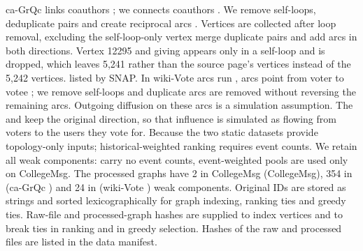 \documentclass[smallextended]{svjour3}
\providecommand{\DIFaddtex}[1]{{\protect\color{blue} \sf #1}} %
\providecommand{\DIFdeltex}[1]{{\protect\color{red} \scriptsize #1}} %
\providecommand{\DIFaddbegin}{} %
\providecommand{\DIFaddend}{} %
\providecommand{\DIFdelbegin}{} %
\providecommand{\DIFdelend}{} %
\providecommand{\DIFadd}[1]{\texorpdfstring{\DIFaddtex{#1}}{#1}} %
\providecommand{\DIFdel}[1]{\texorpdfstring{\DIFdeltex{#1}}{}} %
\providecommand{\DIFscaledelfig}{0.5}
\newlength{\DIFdelgraphicswidth} %
\newlength{\DIFdelgraphicsheight} %
\providecommand{\DIFaddincludegraphics}[2][]{{\color{blue}\fbox{\DIFOincludegraphics[#1]{#2}}}} %
\providecommand{\DIFdelincludegraphics}[2][]{%
\sbox{\DIFdelgraphicsbox}{\DIFOincludegraphics[#1]{#2}}%
\settoboxwidth{\DIFdelgraphicswidth}{\DIFdelgraphicsbox} %
\settoboxtotalheight{\DIFdelgraphicsheight}{\DIFdelgraphicsbox} %
\scalebox{\DIFscaledelfig}{%
\parbox[b]{\DIFdelgraphicswidth}{\usebox{\DIFdelgraphicsbox}\\[-\baselineskip] \rule{\DIFdelgraphicswidth}{0em}}\llap{\resizebox{\DIFdelgraphicswidth}{\DIFdelgraphicsheight}{%
\setlength{\unitlength}{\DIFdelgraphicswidth}%
\begin{picture}(1,1)%
\thicklines\linethickness{2pt} %
{\color[rgb]{1,0,0}\put(0,0){\framebox(1,1){}}}%
{\color[rgb]{1,0,0}\put(0,0){\line( 1,1){1}}}%
{\color[rgb]{1,0,0}\put(0,1){\line(1,-1){1}}}%
\end{picture}%
}\hspace*{3pt}}} %
} %
\DeclareRobustCommand{\DIFaddbegin}{\DIFOaddbegin \let\includegraphics\DIFaddincludegraphics} %
\DeclareRobustCommand{\DIFaddend}{\DIFOaddend \let\includegraphics\DIFOincludegraphics} %
\DeclareRobustCommand{\DIFdelbegin}{\DIFOdelbegin \let\includegraphics\DIFdelincludegraphics} %
\DeclareRobustCommand{\DIFdelend}{\DIFOaddend \let\includegraphics\DIFOincludegraphics} %
\begin{document}
ca-GrQc \DIFdelbegin \DIFdel{links coauthors \cite{grqc}; we }\DIFdelend \DIFaddbegin \DIFadd{connects coauthors \cite{grqc}. We }\DIFaddend remove self-loops, \DIFdelbegin \DIFdel{deduplicate pairs and create reciprocal arcs . Vertices are collected after loop removal, excluding the self-loop-only vertex }\DIFdelend \DIFaddbegin \DIFadd{merge duplicate pairs and add arcs in both directions. Vertex }\DIFaddend 12295 \DIFdelbegin \DIFdel{and giving }\DIFdelend \DIFaddbegin \DIFadd{appears only in a self-loop and is dropped, which leaves }\DIFaddend 5,241 \DIFdelbegin \DIFdel{rather than the source page's }\DIFdelend \DIFaddbegin \DIFadd{vertices instead of the }\DIFaddend 5,242 \DIFdelbegin \DIFdel{vertices. }\DIFdelend \DIFaddbegin \DIFadd{listed by SNAP. In }\DIFaddend wiki-Vote\DIFdelbegin \DIFdel{arcs run }\DIFdelend \DIFaddbegin \DIFadd{, arcs point }\DIFaddend from voter to votee \cite{signed,links}; \DIFaddbegin \DIFadd{we remove }\DIFaddend self-loops and duplicate arcs \DIFdelbegin \DIFdel{are removed without reversing the remaining arcs. Outgoing diffusion on these arcs is a simulation assumption. The }\DIFdelend \DIFaddbegin \DIFadd{and keep the original direction, so that influence is simulated as flowing from voters to the users they vote for. Because the }\DIFaddend two static datasets \DIFdelbegin \DIFdel{provide topology-only inputs; historical-weighted ranking requires event counts. We retain all weak components: }\DIFdelend \DIFaddbegin \DIFadd{carry no event counts, event-weighted pools are used only on CollegeMsg. The processed graphs have }\DIFaddend 2 \DIFdelbegin \DIFdel{in CollegeMsg}\DIFdelend \DIFaddbegin \DIFadd{(CollegeMsg)}\DIFaddend , 354 \DIFdelbegin \DIFdel{in }\DIFdelend \DIFaddbegin \DIFadd{(}\DIFaddend ca-GrQc\DIFaddbegin \DIFadd{) }\DIFaddend and 24 \DIFdelbegin \DIFdel{in }\DIFdelend \DIFaddbegin \DIFadd{(}\DIFaddend wiki-Vote\DIFaddbegin \DIFadd{) weak components}\DIFaddend . Original IDs are stored as strings and sorted lexicographically \DIFdelbegin \DIFdel{for graph indexing, ranking ties and greedy ties. Raw-file and processed-graph hashes are supplied }\DIFdelend \DIFaddbegin \DIFadd{to index vertices and to break ties in ranking and in greedy selection. Hashes of the raw and processed files are listed }\DIFaddend in the data manifest.
\end{document}
